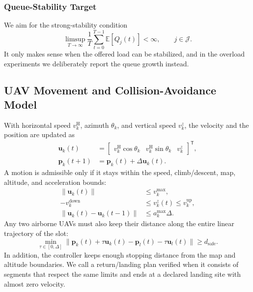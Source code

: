 \subsubsection{Queue-Stability Target}
We aim for the strong-stability condition
\begin{equation}
\limsup_{T\to\infty}\frac1T\sum_{t=0}^{T-1}
\mathbb E[Q_j(t)]<\infty,\qquad j\in\mathcal J.
\label{eq:stability}
\end{equation}
It only makes sense when the offered load can be stabilized, and in the
overload experiments we deliberately report the queue growth instead.

\subsection{UAV Movement and Collision-Avoidance Model}
With horizontal speed $v_k^{\mathrm H}$, azimuth $\theta_k$, and vertical
speed $v_k^z$, the velocity and the position are updated as
\begin{equation}
\begin{aligned}
\boldsymbol u_k(t)&=
\begin{bmatrix}
v_k^{\mathrm H}\cos\theta_k&
v_k^{\mathrm H}\sin\theta_k&v_k^z
\end{bmatrix}^{\mathsf T},\\
\boldsymbol p_k(t+1)&=\boldsymbol p_k(t)+\Delta\boldsymbol u_k(t).
\end{aligned}
\label{eq:uav_motion}
\end{equation}
A motion is admissible only if it stays within the speed, climb/descent,
map, altitude, and acceleration bounds:
\begin{equation}
\begin{aligned}
\|\boldsymbol u_k(t)\|&\le v_k^{\max},\\
-v_k^{\mathrm{down}}&\le v_k^z(t)\le v_k^{\mathrm{up}},\\
\|\boldsymbol u_k(t)-\boldsymbol u_k(t-1)\|&\le a_k^{\max}\Delta.
\end{aligned}
\label{eq:flight_bounds}
\end{equation}
Any two airborne UAVs must also keep their distance along the entire linear
trajectory of the slot:
\begin{equation}
\min_{\tau\in[0,\Delta]}
\|\boldsymbol p_k(t)+\tau\boldsymbol u_k(t)
-\boldsymbol p_l(t)-\tau\boldsymbol u_l(t)\|
\ge d_{\mathrm{safe}}.
\label{eq:collision}
\end{equation}
In addition, the controller keeps enough stopping distance from the map and
altitude boundaries. We call a return/landing plan verified when it consists
of segments that respect the same limits and ends at a declared landing site
with almost zero velocity.

